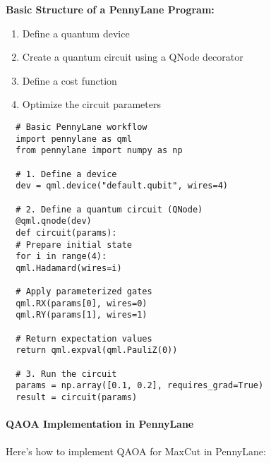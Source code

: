 \vspace{0.3cm}

\noindent
\textbf{Basic Structure of a PennyLane Program:}
\begin{enumerate}
  \item Define a quantum device

  \item Create a quantum circuit using a QNode decorator

  \item Define a cost function

  \item Optimize the circuit parameters
\end{enumerate}

\begin{verbatim}
  # Basic PennyLane workflow
  import pennylane as qml
  from pennylane import numpy as np

  # 1. Define a device
  dev = qml.device("default.qubit", wires=4)

  # 2. Define a quantum circuit (QNode)
  @qml.qnode(dev)
  def circuit(params):
  # Prepare initial state
  for i in range(4):
  qml.Hadamard(wires=i)

  # Apply parameterized gates
  qml.RX(params[0], wires=0)
  qml.RY(params[1], wires=1)

  # Return expectation values
  return qml.expval(qml.PauliZ(0))

  # 3. Run the circuit
  params = np.array([0.1, 0.2], requires_grad=True)
  result = circuit(params)
\end{verbatim}

\vspace{0.3cm}

\paragraph{QAOA Implementation in PennyLane} Here's how to implement QAOA for
MaxCut in PennyLane:

